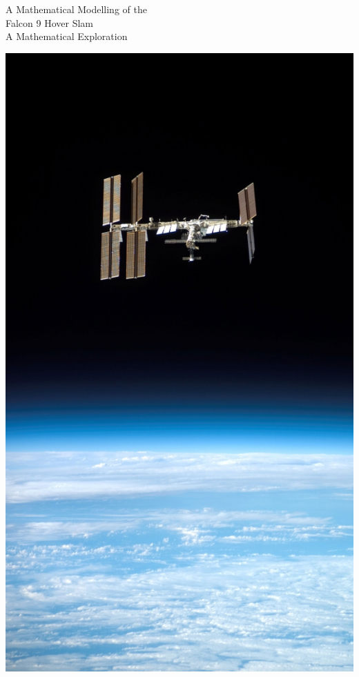 \documentclass[12pt]{article}
\begin{document}
    \begin{titlepage}
        \begin{center}
            {\LARGE A Mathematical Modelling of the \\ Falcon 9 Hover Slam}
            \break
            \\
            {\large A Mathematical Exploration}
            \break
            

            \vspace{14mm}
            \includegraphics[scale=1.5]{iss2.jpg}
            

        \end{center}
    \end{titlepage}
\end{document}
